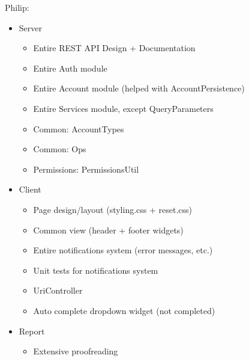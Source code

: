Philip:
\begin{itemize}
	\item Server
	\begin{itemize}
		\item Entire REST API Design + Documentation
		\item Entire Auth module
		\item Entire Account module (helped with AccountPersistence)
		\item Entire Services module, except QueryParameters
		\item Common: AccountTypes
		\item Common: Ops
		\item Permissions: PermissionsUtil
	\end{itemize}
	\item Client
	\begin{itemize}
		\item Page design/layout (styling.css + reset.css)
		\item Common view (header + footer widgets)
		\item Entire notifications system (error messages, etc.)
		\item Unit tests for notifications system
		\item UriController
		\item Auto complete dropdown widget (not completed)
	\end{itemize}
	\item Report
	\begin{itemize}
		\item Extensive proofreading
	\end{itemize}
\end{itemize} 